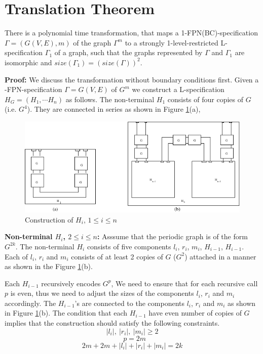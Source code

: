 \section{Translation Theorem}\label{sec:translation}


\begin{theorem}\label{th:translate}
There is a polynomial time transformation, that maps a 
1-FPN(BC)-specification $\Gamma = (G(V,E), m)$ of the  graph $\Gamma^m$ 
to a strongly 1-level-restricted 
L-specification $\Gamma_1$ of a graph, 
such that the graphs represented by 
$\Gamma$ and $\Gamma_1$ are isomorphic and 
$size(\Gamma_1) = (size(\Gamma))^2$.
\end{theorem}

\noindent
{\bf Proof:} We discuss the transformation without boundary conditions first.
Given a {-FPN}-specification  $\Gamma = G(V,E)$ of $G^m$ 
we construct a {\sf L}-specification $H_G = (H_1, \cdots H_n)$ as follows. 
The non-terminal $H_1$  consists of four copies of $G$ (i.e. $G^4$). 
They are connected in series as shown in Figure \ref{translation1.fig}(a), 

\begin{figure}[tbh]
\centering
\includegraphics{translation1}
\caption{Construction of $H_i$, $1 \leq i \leq n$}
\label{translation1.fig}
\end{figure}




\noindent 
{\bf Non-terminal  $H_i$, $2 \leq i \leq n$:}
Asssume that the periodic graph is of the form $G^{2k}$.
The non-terminal $H_i$ consists of five components
$l_i$, $r_i$, $m_i$, $H_{i-1}$, $H_{i-1}$. 
Each of $l_i$, $r_i$ and  $m_i$ consists of at least 2 copies of $G$ 
($G^2$) attached in a manner as shown in the Figure \ref{translation1.fig}(b). 

Each $H_{i-1}$ recursively encodes $G^{p}$, 
We need to ensure that for each recursive
call $p$ is even, thus we need to adjust the sizes of 
the components $l_i$, $r_i$ and  $m_i$ accordingly.
The $H_{i-1}$'s 
are connected to the components $l_i$, $r_i$ and  $m_i$ as shown in 
Figure \ref{translation1.fig}(b). 
The condition that each $H_{i-1}$ have even number of copies of $G$ 
implies that the construction should satisfy the following constraints.
\[ |l_i|, ~ |r_i|, ~  |m_i| \geq 2 \]  
\[~~~ p = 2m \] 
\[2m + 2m + |l_i| + |r_i| +  |m_i| = 2k \]  


